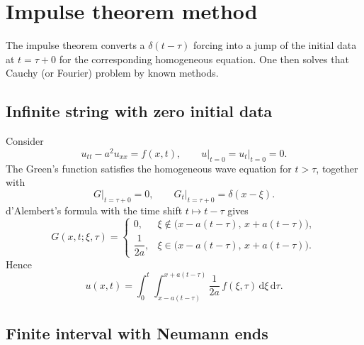 \section{Impulse theorem method}

The impulse theorem converts a $\delta(t-\tau)$ forcing into a jump of the initial data at $t=\tau+0$ for the corresponding homogeneous equation. One then solves that Cauchy (or Fourier) problem by known methods.

\subsection{Infinite string with zero initial data}

Consider
\begin{equation}
u_{tt}-a^2 u_{xx}=f(x,t),
\qquad
u\big|_{t=0}=u_t\big|_{t=0}=0.
\end{equation}
The Green's function satisfies the homogeneous wave equation for $t>\tau$, together with
\begin{equation}
G\big|_{t=\tau+0}=0,
\qquad
G_t\big|_{t=\tau+0}=\delta(x-\xi).
\end{equation}
d'Alembert's formula with the time shift $t\mapsto t-\tau$ gives
\begin{equation}
G(x,t;\xi,\tau)
=
\begin{cases}
0, & \xi\notin\bigl(x-a(t-\tau),\,x+a(t-\tau)\bigr),\\[0.3em]
\dfrac{1}{2a}, & \xi\in\bigl(x-a(t-\tau),\,x+a(t-\tau)\bigr).
\end{cases}
\end{equation}
Hence
\begin{equation}
u(x,t)
=\int_0^{t}\int_{x-a(t-\tau)}^{x+a(t-\tau)}
\frac{1}{2a}\,f(\xi,\tau)\,\mathrm{d}\xi\,\mathrm{d}\tau.
\end{equation}

\subsection{Finite interval with Neumann ends}


